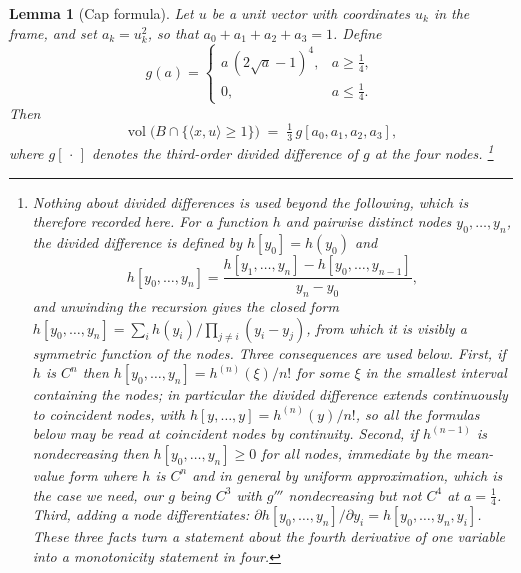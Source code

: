 \documentclass[11pt,reqno]{amsart}
\renewcommand{\_}{\origunderscore\allowbreak}
\numberwithin{equation}{section}
\theoremstyle{plain}
\newtheorem{lem}[thm]{Lemma}
\theoremstyle{definition}
\theoremstyle{remark}
\DeclareMathOperator{\vol}{vol}
\begin{document}
\begin{lem}[Cap formula]\label{lem:cap-formula}
Let $u$ be a unit vector with coordinates $u_k$ in the frame, and set
$a_k=u_k^2$, so that $a_0+a_1+a_2+a_3=1$. Define
\[
  g(a)=\begin{cases} a\,(2\sqrt a-1)^4, & a\ge\tfrac14,\\[2pt] 0,& a\le\tfrac14 .\end{cases}
\]
Then
\[
  \vol\bigl(B\cap\{\langle x,u\rangle\ge1\}\bigr)
  \;=\;\tfrac13\,g[a_0,a_1,a_2,a_3],
\]
where $g[\,\cdot\,]$ denotes the third-order divided difference of $g$ at
the four nodes.%
\footnote{Nothing about divided differences is used beyond the
  following, which is therefore recorded here. For a
  function $h$ and pairwise distinct nodes $y_0,\dots,y_n$, the divided
  difference is defined by $h[y_0]=h(y_0)$ and
  \[
    h[y_0,\dots,y_n]
    =\frac{h[y_1,\dots,y_n]-h[y_0,\dots,y_{n-1}]}{y_n-y_0},
  \]
  and unwinding the recursion gives the closed form
  $h[y_0,\dots,y_n]=\sum_{i}h(y_i)\big/\prod_{j\ne i}(y_i-y_j)$, from
  which it is visibly a symmetric function of the nodes. Three
  consequences are used below. First, if $h$ is $C^n$ then
  $h[y_0,\dots,y_n]=h^{(n)}(\xi)/n!$ for some $\xi$ in the smallest
  interval containing the nodes; in particular the divided difference
  extends continuously to coincident nodes, with
  $h[y,\dots,y]=h^{(n)}(y)/n!$, so all the formulas below may be read at
  coincident nodes by continuity. Second, if $h^{(n-1)}$ is
  nondecreasing then $h[y_0,\dots,y_n]\ge0$ for all nodes, immediate by
  the mean-value form where $h$ is $C^n$ and in general by uniform
  approximation, which is the case we need, our $g$ being $C^3$ with
  $g'''$ nondecreasing but not $C^4$ at $a=\tfrac14$. Third, adding a
  node differentiates:
  $\partial h[y_0,\dots,y_n]/\partial y_i=h[y_0,\dots,y_n,y_i]$. These
  three facts turn a statement about the fourth derivative of one
  variable into a monotonicity statement in four.}
\end{lem}
\end{document}
